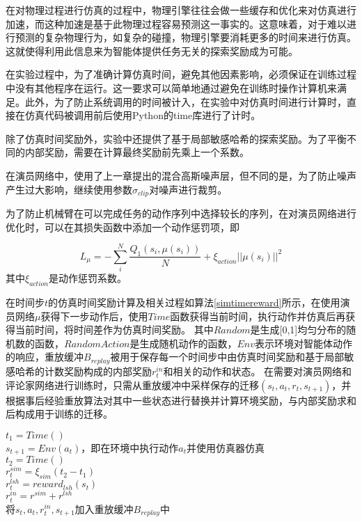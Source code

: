 在对物理过程进行仿真的过程中，物理引擎往往会做一些缓存和优化来对仿真进行加速，而这种加速是基于此物理过程容易预测这一事实的。这意味着，对于难以进行预测的复杂物理行为，如复杂的碰撞，物理引擎要消耗更多的时间来进行仿真。这就使得利用此信息来为智能体提供任务无关的探索奖励成为可能。

在实验过程中，为了准确计算仿真时间，避免其他因素影响，必须保证在训练过程中没有其他程序在运行。这一要求可以简单地通过避免在训练时操作计算机来满足。此外，为了防止系统调用的时间被计入，在实验中对仿真时间进行计算时，直接在仿真代码被调用前后使用Python的time库进行了计时。

除了仿真时间奖励外，实验中还提供了基于局部敏感哈希的探索奖励。为了平衡不同的内部奖励，需要在计算最终奖励前先乘上一个系数。

在演员网络中，使用了上一章提出的混合高斯噪声层，但不同的是，为了防止噪声产生过大影响，继续使用参数$\sigma_{clip}$对噪声进行裁剪。

为了防止机械臂在可以完成任务的动作序列中选择较长的序列，在对演员网络进行优化时，可以在其损失函数中添加一个动作惩罚项，即

   $$ L_\mu = -\sum_i^N\frac{Q_1(s_i, \mu(s_i))}{N} + \xi_{action}||\mu(s_i)||^2$$
其中$\xi_{action}$是动作惩罚系数。

在时间步$t$的仿真时间奖励计算及相关过程如算法\ref{simtimereward}所示，在使用演员网络$\mu$获得下一步动作后，使用$Time$函数获得当前时间，执行动作并仿真后再获得当前时间，将时间差作为仿真时间奖励。
其中$Random$是生成[0,1]均匀分布的随机数的函数，$RandomAction$是生成随机动作的函数，$Env$表示环境对智能体动作的响应，重放缓冲$B_{replay}$被用于保存每一个时间步中由仿真时间奖励和基于局部敏感哈希的计数奖励构成的内部奖励$r^{in}_t$和相关的动作和状态。
在需要对演员网络和评论家网络进行训练时，只需从重放缓冲中采样保存的迁移$(s_t,a_t,r_t,s_{t+1})$，并根据事后经验重放算法对其中一些状态进行替换并计算环境奖励，与内部奖励求和后构成用于训练的迁移。
\begin{algorithm}

    $t_1 = Time()$\\
    $s_{t+1}=Env(a_t)$，即在环境中执行动作$a_t$并使用仿真器仿真\\
    $t_2 = Time()$\\
    $r^{sim}_t=\xi_{sim}(t_2-t_1)$\\
    $r^{lsh}_t=reward_{lsh}(s_t)$\\
    $r^{in}_t=r^{sim}+r^{lsh}$\\
    将$s_t,a_t,r^{in}_t,s_{t+1}$加入重放缓冲$B_{replay}$中
\end{algorithm}


